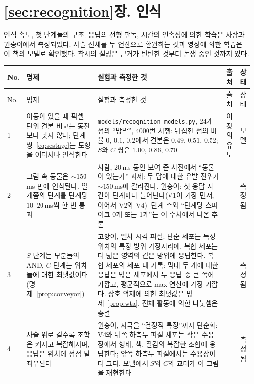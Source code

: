 \section{\ref{sec:recognition}장. 인식}

인식 속도, 첫 단계들의 구조, 응답의 선형 판독, 시간의 연속성에 의한 학습은 사람과 원숭이에서 측정되었다. 사슬 전체를 두 연산으로 환원하는 것과 영상에 의한 학습은 이 책의 모델로 확인했다. 착시의 설명은 근거가 탄탄한 것부터 논쟁 중인 것까지 있다.

{\footnotesize
\setlength{\tabcolsep}{3pt}\renewcommand{\arraystretch}{1.15}
\begin{longtable}{>{\raggedright}p{0.5cm}>{\raggedright}p{4.0cm}>{\raggedright}p{5.6cm}>{\raggedright}p{2.3cm}>{\raggedright\arraybackslash}p{1.7cm}}
\toprule
No. & 명제 & 실험과 측정한 것 & 출처 & 상태 \\
\midrule\endfirsthead
\toprule
No. & 명제 & 실험과 측정한 것 & 출처 & 상태 \\
\midrule\endhead
1 & 이동이 있을 때 픽셀 단위 견본 비교는 동전보다 낫지 않다; 단계 쌍~\eqref{eq:scstage}는 도형을 어디서나 인식한다 & \texttt{models/\allowbreak recognition\_models.py}, $24$개 점의 “망막”, $4000$번 시행: 뒤집힌 점의 비율 $0$, $0.1$, $0.2$에서 견본은 $0.49$, $0.51$, $0.52$; $S$와 $C$ 쌍은 $1.00$, $0.86$, $0.70$ & 이 장의 유도 & 모델 \\
2 & 그림 속 동물은 $\sim150$\,ms 만에 인식된다. 열 개쯤의 단계를 단계당 $10$--$20$\,ms씩 한 번 통과 & 사람, $20$\,ms 동안 보여 준 사진에서 “동물이 있는가” 과제: 두 답에 대한 유발 전위가 $\sim150$\,ms에 갈라진다. 원숭이: 첫 응답 시간이 단계마다 늘어난다(V1이 가장 먼저, 이어서 V2와 V4). 단계 수와 “단계당 스파이크 0개 또는 1개”는 이 수치에서 나온 추론 & \cite{Thorpe1996,Schmolesky1998} & 측정됨 \\
3 & $S$ 단계는 부분들의 AND, $C$ 단계는 위치들에 대한 최댓값이다(명제~\ref{prop:conveyor}) & 고양이, 일차 시각 피질: 단순 세포는 특정 위치의 특정 방위 가장자리에, 복합 세포는 더 넓은 영역의 같은 방위에 응답한다. 복합 세포의 세포 내 기록: 막대 두 개에 대한 응답은 많은 세포에서 두 응답 중 큰 쪽에 가깝고, 평균적으로 max 연산에 가장 가깝다. 상호 억제에 의한 최댓값은 명제~\ref{prop:wta}, 전체 활동에 의한 나눗셈은 총설 & \cite{HubelWiesel1962,Lampl2004,Carandini2012} & 측정됨 \\
4 & 사슬 위로 갈수록 조합은 커지고 복잡해지며, 응답은 위치에 점점 덜 좌우된다 & 원숭이, 자극을 “결정적 특징”까지 단순화: V4와 뒤쪽 하측두 피질 세포는 작은 수용장에서 형태, 색, 질감의 복잡한 조합에 응답한다; 앞쪽 하측두 피질에서는 수용장이 더 크다. 모델에서 $S$와 $C$의 교대가 이 그림을 재현한다 & \cite{KobatakeTanaka1994,Riesenhuber1999} & 측정됨 \\

\end{longtable}}
